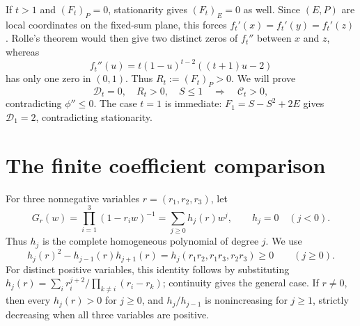 \documentclass[11pt]{article}
\numberwithin{equation}{section}
\begin{document}
If $t>1$ and $(F_t)_P=0$, stationarity gives $(F_t)_E=0$ as well. Since
$(E,P)$ are local coordinates on the fixed-sum plane, this forces
$f_t'(x)=f_t'(y)=f_t'(z)$. Rolle's theorem would then give two distinct
zeros of $f_t''$ between $x$ and $z$, whereas
\[
 f_t''(u)=t(1-u)^{t-2}((t+1)u-2)
\]
has only one zero in $(0,1)$. Thus $R_t:=(F_t)_P>0$. We will prove
\begin{equation}\label{eq:target}
 \mathcal D_t=0,\quad R_t>0,\quad S\le1
 \quad\Longrightarrow\quad \mathcal C_t>0,
\end{equation}
contradicting $\phi''\le0$. The case $t=1$ is immediate:
$F_1=S-S^2+2E$ gives $\mathcal D_1=2$, contradicting stationarity.

\section{The finite coefficient comparison}
For three nonnegative variables $r=(r_1,r_2,r_3)$, let
\[
 G_r(w)=\prod_{i=1}^3(1-r_iw)^{-1}
       =\sum_{j\ge0}h_j(r)w^j,\qquad h_j=0\quad(j<0).
\]
Thus $h_j$ is the complete homogeneous polynomial of degree $j$. We use
\begin{equation}\label{eq:turan}
 h_j(r)^2-h_{j-1}(r)h_{j+1}(r)
 =h_j(r_1r_2,r_1r_3,r_2r_3)\ge0\qquad(j\ge0).
\end{equation}
For distinct positive variables, this identity follows by substituting
$h_j(r)=\sum_i r_i^{j+2}/\prod_{k\ne i}(r_i-r_k)$; continuity gives the
general case. If $r\ne0$, then every $h_j(r)>0$ for $j\ge0$, and
$h_j/h_{j-1}$ is nonincreasing for $j\ge1$, strictly decreasing when all
three variables are positive.
\end{document}
